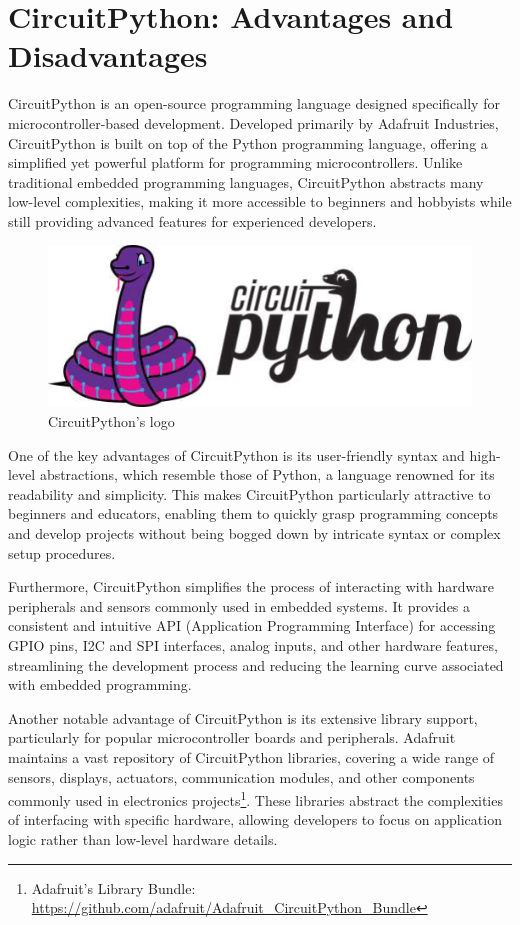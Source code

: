 \section{CircuitPython: Advantages and Disadvantages}

CircuitPython is an open-source programming language designed specifically for 
microcontroller-based development. Developed primarily by Adafruit Industries, CircuitPython is 
built on top of the Python programming language, offering a simplified yet powerful platform for 
programming microcontrollers. Unlike traditional embedded programming languages, CircuitPython 
abstracts many low-level complexities, making it more accessible to beginners and hobbyists while 
still providing advanced features for experienced developers.

\begin{figure}[h]
	\centering
	\includegraphics[width = .5\textwidth]{Imagenes/Vectorial/circuitpython_logo.pdf}
	\caption{CircuitPython's logo}
	\label{fig:circuitpython_logo}
\end{figure}

One of the key advantages of CircuitPython is its user-friendly syntax and high-level abstractions, 
which resemble those of Python, a language renowned for its readability and simplicity. This makes 
CircuitPython particularly attractive to beginners and educators, enabling them to quickly grasp 
programming concepts and develop projects without being bogged down by intricate syntax or complex 
setup procedures.

Furthermore, CircuitPython simplifies the process of interacting with hardware peripherals and 
sensors commonly used in embedded systems. It provides a consistent and intuitive API (Application 
Programming Interface) for accessing GPIO pins, I2C and SPI interfaces, analog inputs, and other 
hardware features, streamlining the development process and reducing the learning curve associated 
with embedded programming.

Another notable advantage of CircuitPython is its extensive library support, particularly for 
popular microcontroller boards and peripherals. Adafruit maintains a vast repository of 
CircuitPython libraries, covering a wide range of sensors, displays, actuators, communication 
modules, and other components commonly used in electronics projects\footnote{Adafruit's Library 
Bundle: \url{https://github.com/adafruit/Adafruit_CircuitPython_Bundle}}. These libraries abstract 
the complexities of interfacing with specific hardware, allowing developers to focus on application 
logic rather than low-level hardware details.

